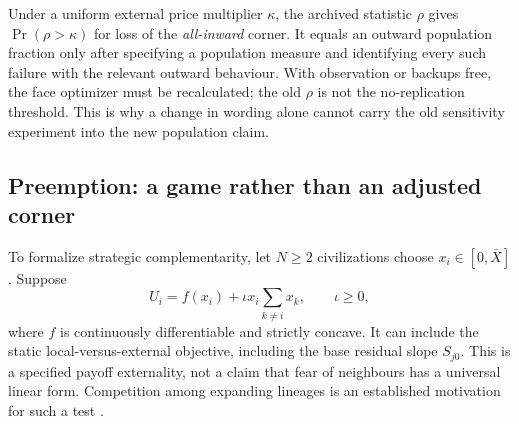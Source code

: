 \documentclass[11pt,a4paper]{article}
\theoremstyle{definition}\newtheorem{definition}{Definition}
\begin{document}
Under a uniform external price multiplier $\kappa$, the archived statistic
$\rho$ gives $\Pr(\rho>\kappa)$ for loss of the \emph{all-inward} corner.
It equals an outward population fraction only after specifying a
population measure and identifying every such failure with the relevant
outward behaviour. With observation or backups free, the face optimizer
must be recalculated; the old $\rho$ is not the no-replication threshold.
This is why a change in wording alone cannot carry the old sensitivity
experiment into the new population claim.

\subsection{Preemption: a game rather than an adjusted corner}
To formalize strategic complementarity, let $N\geq2$ civilizations choose
$x_i\in[0,\bar X]$. Suppose
\begin{equation}
 U_i=f(x_i)+\iota x_i\sum_{k\ne i}x_k,
 \qquad \iota\geq0,
 \label{eq:preemption-game}
\end{equation}
where $f$ is continuously differentiable and strictly concave. It can
include the static local-versus-external objective, including the base
residual slope $S_{j0}$. This is a specified payoff externality, not a
claim that fear of neighbours has a universal linear form. Competition
among expanding lineages is an established motivation for such a test
\citep{Hanson1998}.
\end{document}
